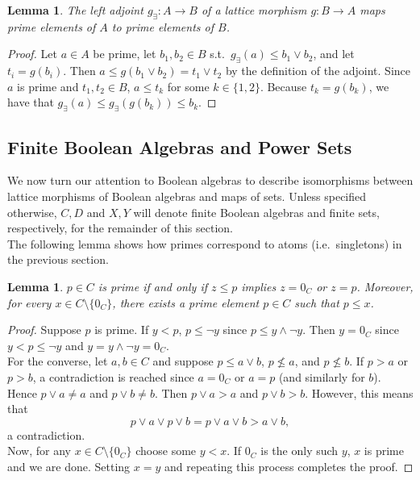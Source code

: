 \documentclass{article}
\newtheorem{lemma}[proposition]{Lemma}
\numberwithin{equation}{section}
\newcommand{\meet}{\wedge}
\newcommand{\join}{\vee}
\begin{document}
\begin{lemma} \label{lem:left-adjoint-maps-primes-to-primes}
The left adjoint $g_\exists : A \to B$ of a lattice morphism $g : B \to A$ maps prime elements of $A$ to prime elements of $B$.
\end{lemma}

\begin{proof}
Let $a \in A$ be prime, let $b_1, b_2 \in B$ s.t.\ $g_\exists(a) \leq b_1 \join b_2$, and let $t_i = g(b_i)$. Then $a \leq g(b_1 \join b_2) = t_1 \join t_2$ by the definition of the adjoint. Since $a$ is prime and $t_1, t_2 \in B$, $a \leq t_k$ for some $k \in \{1, 2\}$. Because $t_k = g(b_k)$, we have that $g_\exists(a) \leq g_\exists(g(b_k)) \leq b_k$.
\end{proof}

\subsection{Finite Boolean Algebras and Power Sets}

We now turn our attention to Boolean algebras to describe isomorphisms between lattice morphisms of Boolean algebras and maps of sets. Unless specified otherwise, $C, D$ and $X, Y$ will denote finite Boolean algebras and finite sets, respectively, for the remainder of this section. \\

The following lemma shows how primes correspond to atoms (i.e.\ singletons) in the previous section.

\begin{lemma} \label{lem:primes-are-atoms}
$p \in C$ is prime if and only if $z \leq p$ implies $z = 0_C$ or $z = p$. Moreover, for every $x \in C \setminus \{0_C\}$, there exists a prime element $p \in C$ such that $p \leq x$. 
\end{lemma}

\begin{proof}
Suppose $p$ is prime. If $y < p$, $p \leq \neg y$ since $p \leq y \meet \neg y$. Then $y = 0_C$ since $y < p \leq \neg y$ and $y = y \meet \neg y = 0_C$. \\

For the converse, let $a, b \in C$ and suppose $p \leq a \join b$, $p \not\leq a$, and $p \not\leq b$. If $p > a$ or $p > b$, a contradiction is reached since $a = 0_C$ or $a = p$ (and similarly for $b$). Hence $p \join a \neq a$ and $p \join b \neq b$. Then $p \join a > a$ and $p \join b > b$. However, this means that $$p \join a \join p \join b = p \join a \join b > a \join b,$$ a contradiction. \\

Now, for any $x \in C \setminus \{0_C\}$ choose some $y < x$. If $0_C$ is the only such $y$, $x$ is prime and we are done. Setting $x = y$ and repeating this process completes the proof.
\end{proof}
\end{document}
